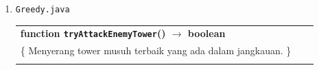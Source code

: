 \documentclass{article}
\newenvironment{pseudobox}
{
\centering
\begin{longtable}{|p{0.94\linewidth}|}
\hline
}
{
\\ \hline
\end{longtable}
\vspace{0.05cm}
}
\begin{document}
\begin{enumerate}[label=\alph*.]
\begin{enumerate}[label=\alph*.]
\begin{pseudobox}
\hspace*{3em}if \texttt{G.pushTarget} $\neq$ null then \\
\hspace*{4.5em}\texttt{d} $\leftarrow$ jarakKuadrat(\texttt{G.me, G.pushTarget}) - jarakKuadrat(\texttt{nxt, G.pushTarget}) \\
\hspace*{4.5em}if \texttt{d > 0} then \\
\hspace*{6em}\texttt{score} $\leftarrow$ \texttt{score} + 16 \\
\hspace*{4.5em}else if \texttt{d < 0} then \\
\hspace*{6em}\texttt{score} $\leftarrow$ \texttt{score} - 12 \\
\hspace*{4.5em}endif \\
\hspace*{3em}endif \\

\hspace*{3em}if \texttt{score > bestScore} then \\
\hspace*{4.5em}\texttt{bestScore} $\leftarrow$ \texttt{score} \\
\hspace*{4.5em}\texttt{bestDir} $\leftarrow$ \texttt{dir} \\
\hspace*{3em}endif \\
\hspace*{1.5em}endfor \\

\hspace*{1.5em}if \texttt{bestDir} $\neq$ null then \\
\hspace*{3em}call \texttt{executeMove(bestDir)} \\
\hspace*{1.5em}endif
\end{pseudobox}

\item \texttt{Greedy.java}

\begin{pseudobox}
\textbf{function \texttt{tryAttackEnemyTower}() $\rightarrow$ boolean} \\
\{ Menyerang tower musuh terbaik yang ada dalam jangkauan. \} \\


\end{pseudobox}
\end{enumerate}
\end{enumerate}
\end{document}
